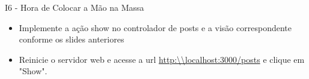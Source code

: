 \begin{frame}[t, fragile]{I6 - Hora de Colocar a Mão na Massa}
	\begin{itemize}
		
		\item Implemente a ação \alert{show} no controlador de posts e a visão correspondente conforme os slides anteriores
		\item Reinicie o servidor web e acesse a url \url{http:\\localhost:3000/posts} e clique em \alert{"Show"}.
	\end{itemize}
\end{frame}
